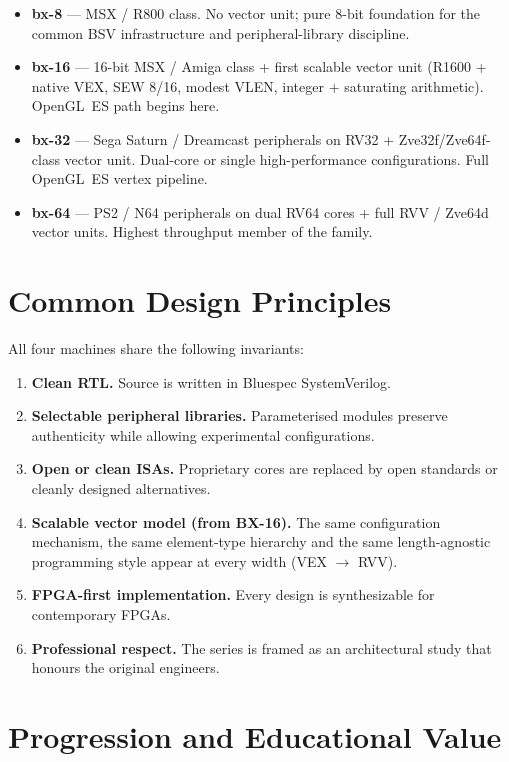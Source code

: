 \documentclass[11pt,a4paper]{article}
\begin{document}
\begin{itemize}[leftmargin=1.5em]
  \item \textbf{bx-8} --- MSX / R800 class. No vector unit; pure 8-bit foundation for the common BSV infrastructure and peripheral-library discipline.
  \item \textbf{bx-16} --- 16-bit MSX / Amiga class + first scalable vector unit (R1600 + native VEX, SEW 8/16, modest VLEN, integer + saturating arithmetic). OpenGL~ES path begins here.
  \item \textbf{bx-32} --- Sega Saturn / Dreamcast peripherals on RV32 + Zve32f/Zve64f-class vector unit. Dual-core or single high-performance configurations. Full OpenGL~ES vertex pipeline.
  \item \textbf{bx-64} --- PS2 / N64 peripherals on dual RV64 cores + full RVV / Zve64d vector units. Highest throughput member of the family.
\end{itemize}

\section{Common Design Principles}

All four machines share the following invariants:

\begin{enumerate}[leftmargin=1.5em]
  \item \textbf{Clean RTL.} Source is written in Bluespec SystemVerilog.
  \item \textbf{Selectable peripheral libraries.} Parameterised modules preserve authenticity while allowing experimental configurations.
  \item \textbf{Open or clean ISAs.} Proprietary cores are replaced by open standards or cleanly designed alternatives.
  \item \textbf{Scalable vector model (from BX-16).} The same configuration mechanism, the same element-type hierarchy and the same length-agnostic programming style appear at every width (VEX $\rightarrow$ RVV).
  \item \textbf{FPGA-first implementation.} Every design is synthesizable for contemporary FPGAs.
  \item \textbf{Professional respect.} The series is framed as an architectural study that honours the original engineers.
\end{enumerate}

\section{Progression and Educational Value}
\end{document}
